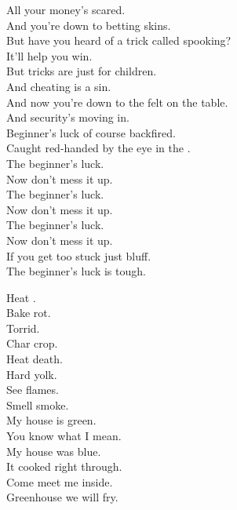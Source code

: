 All your money's scared. \\
And you're down to betting skins. \\
But have you heard of a trick called spooking? \\
It'll help you win. \\
But tricks are just for children. \\
And cheating is a sin. \\
And now you're down to the felt on the table. \\
And security's moving in. \\

Beginner's luck of course backfired. \\
Caught red-handed by the eye in the . \\

The beginner's luck. \\
Now don't mess it up. \\
The beginner's luck. \\
Now don't mess it up. \\
The beginner's luck. \\
Now don't mess it up. \\
If you get too stuck just bluff. \\
The beginner's luck is tough. \\





Heat . \\
Bake rot. \\
Torrid. \\
Char crop. \\
Heat death. \\
Hard yolk. \\
See flames. \\
Smell smoke. \\

My house is green. \\
You know what I mean. \\
My house was blue. \\
It cooked right through. \\

Come meet me inside. \\
Greenhouse we will fry. \\

